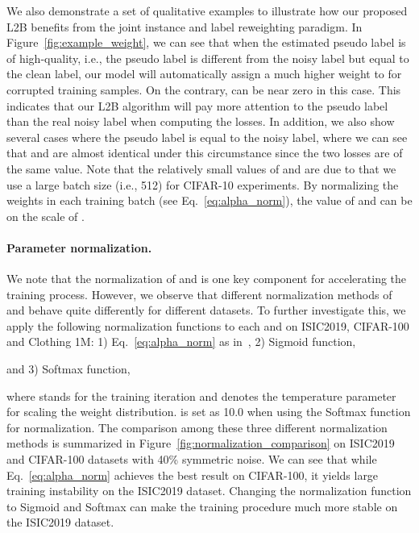 \documentclass{article}
\begin{document}
We also demonstrate a set of qualitative examples to illustrate how our proposed L2B benefits from the joint instance and label reweighting paradigm. 
In Figure~\ref{fig:example_weight}, we can see that when the estimated  pseudo label is of high-quality, i.e., the pseudo label is different from the noisy label but equal to the clean label, our model will automatically assign a much higher weight to  for corrupted training samples. On the contrary,  can be near zero in this case. This indicates that our L2B algorithm will pay more attention to the pseudo label than the real noisy label when computing the losses.
In addition, we also show several cases where the pseudo label is equal to the noisy label, where we can see that  and  are almost identical under this circumstance since the two losses are of the same value. 
Note that the relatively small values of  and  are due to that we use a large batch size (i.e., 512) for CIFAR-10 experiments. By normalizing the weights in each training batch (see Eq.~\eqref{eq:alpha_norm}), the value of  and  can be on the scale of .






\paragraph{Parameter normalization.}
We note that the normalization of  and  is one key component for accelerating the training process.
However, we observe that different normalization methods of  and  behave quite differently for different datasets. 
To further investigate this, we apply the following normalization functions to each  and  on ISIC2019, CIFAR-100 and Clothing 1M: 1) Eq.~\eqref{eq:alpha_norm} as in~\cite{ren2018learning}, 2) Sigmoid function,

and 3) Softmax function,

where  stands for the training iteration and  denotes the temperature parameter for scaling the weight distribution. 
 is set as 10.0 when using the Softmax function for normalization.
The comparison among these three different normalization methods is summarized in Figure~\ref{fig:normalization_comparison} on ISIC2019 and CIFAR-100 datasets with 40\% symmetric noise. 
We can see that while Eq.~\eqref{eq:alpha_norm} achieves the best result on CIFAR-100, it yields large training instability on the ISIC2019 dataset. Changing the normalization function to Sigmoid and Softmax can make the training procedure much more stable on the ISIC2019 dataset. 
\end{document}
